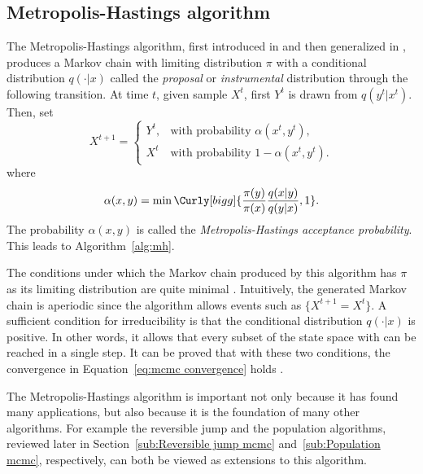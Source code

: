 \subsection{Metropolis-Hastings algorithm}
\label{sub:Metropolis-Hastings algorithm}

The Metropolis-Hastings algorithm, first introduced in
\cite{Metropolis:1953ex} and then generalized in \cite{Hastings:1970gd},
produces a Markov chain with limiting distribution $\pi$ with a conditional
distribution $q(\cdot|x)$ called the \emph{proposal} or \emph{instrumental}
distribution through the following transition. At time $t$, given sample
$X^t$, first $Y^t$ is drawn from $q(y^t|x^t)$. Then, set
\begin{equation*}
  X^{t+1} =
  \begin{cases}
    Y^t, &\text{with probability } \alpha(x^t,y^t),\\
    X^t  &\text{with probability } 1 - \alpha(x^t,y^t).
  \end{cases}
\end{equation*}
where
\begin{equation}
  \alpha(x,y) =
  \min\Curly[bigg]{\frac{\pi(y)}{\pi(x)}\frac{q(x|y)}{q(y|x)},1}.
\end{equation}
The probability $\alpha(x,y)$ is called the \emph{Metropolis-Hastings
  acceptance probability}. This leads to Algorithm~\ref{alg:mh}.



The conditions under which the Markov chain produced by this algorithm has
$\pi$ as its limiting distribution are quite minimal
\cite[][sec.~7.3.2]{Robert:2004tn}. Intuitively, the generated Markov chain
is aperiodic since the algorithm allows events such as $\{X^{t+1} = X^t\}$. A
sufficient condition for irreducibility is that the conditional distribution
$q(\cdot|x)$ is positive. In other words, it allows that every subset of the
state space with can be reached in a single step. It can be proved that with
these two conditions, the convergence in Equation~\eqref{eq:mcmc convergence}
holds \cite[][Theorem~7.4 and Corollary~7.5]{Robert:2004tn}.

The Metropolis-Hastings algorithm is important not only because it has found
many applications, but also because it is the foundation of many other
algorithms. For example the reversible jump \mcmc and the population \mcmc
algorithms, reviewed later in Section~\ref{sub:Reversible jump mcmc}
and~\ref{sub:Population mcmc}, respectively, can both be viewed as extensions
to this algorithm.

